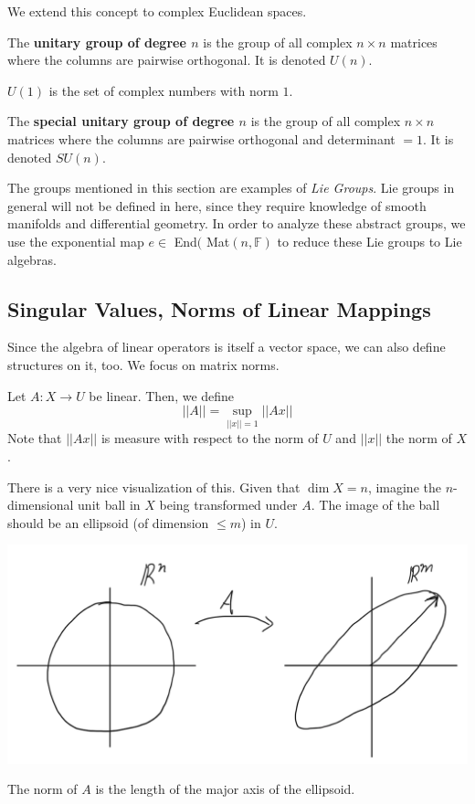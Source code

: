   We extend this concept to complex Euclidean spaces. 

  \begin{definition}
  The \textbf{unitary group of degree $n$} is the group of all complex $n \times n$ matrices where the columns are pairwise orthogonal. It is denoted $U(n)$. 
  \end{definition}

  \begin{example}
  $U(1)$ is the set of complex numbers with norm $1$. 
  \end{example}

  \begin{definition}
  The \textbf{special unitary group of degree $n$} is the group of all complex $n \times n$ matrices where the columns are pairwise orthogonal and determinant $=1$. It is denoted $SU(n)$. 
  \end{definition}

  The groups mentioned in this section are examples of \textit{Lie Groups}. Lie groups in general will not be defined in here, since they require knowledge of smooth manifolds and differential geometry. In order to analyze these abstract groups, we use the exponential map $e \in$ End$($ Mat$(n, \mathbb{F})$ to reduce these Lie groups to Lie algebras.

\subsection{Singular Values, Norms of Linear Mappings}

  Since the algebra of linear operators is itself a vector space, we can also define structures on it, too. We focus on matrix norms. 

  \begin{definition}
  Let $A: X \longrightarrow U$ be linear. Then, we define
  \[||A|| = \sup_{||x||=1} ||A x||\]
  Note that $||A x||$ is measure with respect to the norm of $U$ and $||x||$ the norm of $X$. 
  \end{definition}

  There is a very nice visualization of this. Given that $\dim{X}=n$, imagine the $n$-dimensional unit ball in $X$ being transformed under $A$. The image of the ball should be an ellipsoid (of dimension $\leq m$) in $U$. 
  \begin{center}
      \includegraphics[scale=0.4]{img/Matrix_Norm_Visualization.png}
  \end{center}
  The norm of $A$ is the length of the major axis of the ellipsoid. 

